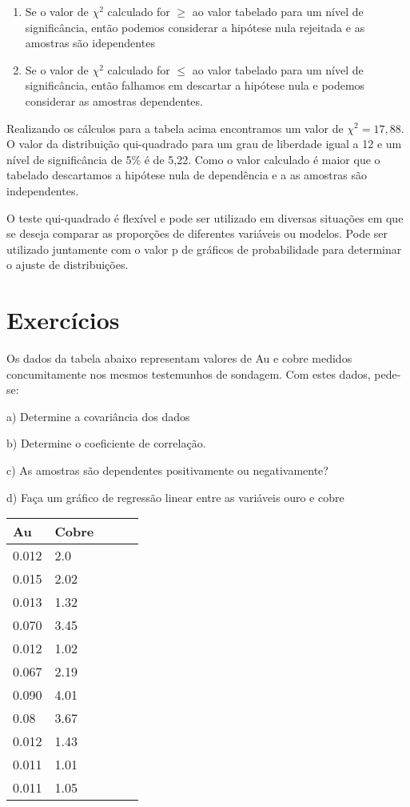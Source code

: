 \begin{enumerate}
	\item Se o valor de $\chi^2$ calculado for $\geq$ ao valor tabelado para um nível de significância, então podemos considerar a hipótese nula rejeitada e as amostras são idependentes
	\item Se o valor de $\chi^2$ calculado for $\leq$ ao valor tabelado para um nível de significância, então falhamos em descartar a hipótese nula e podemos considerar as amostras dependentes. 
\end{enumerate}

Realizando os cálculos para a tabela acima encontramos um valor de $\chi^2= 17,88$. O valor da distribuição qui-quadrado para um grau de liberdade igual a 12 e um nível de significância de 5\% é de 5,22. Como o valor calculado é maior que o tabelado descartamos a hipótese nula de dependência e a as amostras são independentes. 

O teste qui-quadrado é flexível e pode ser utilizado em diversas situações em que se deseja comparar as proporções de diferentes variáveis ou modelos. Pode ser utilizado juntamente com o valor p de gráficos de probabilidade para determinar o ajuste de distribuições. 

\section{Exercícios}

\begin{exercise}
	
	Os dados da tabela abaixo representam valores de Au e cobre medidos concumitamente nos mesmos testemunhos de sondagem. Com estes dados, pede-se:
	
	a) Determine a covariância dos dados 
	
	b) Determine o coeficiente de correlação.
	
	c) As amostras são dependentes positivamente ou negativamente?
	
	d) Faça um gráfico de regressão linear entre as variáveis ouro e cobre
	
	\begin{tabular}{lllll}
		\hline
		Au & Cobre &  &  &  \\ \hline
		0.012      & 2.0  &  &  &  \\
		0.015      & 2.02 &  &  &  \\
		0.013      & 1.32 &  &  &  \\
		0.070      & 3.45 &  &  &  \\
		0.012      & 1.02 &  &  &  \\
		0.067      & 2.19 &  &  &  \\
		0.090      & 4.01 &  &  &  \\
		0.08      & 3.67 &  &  &  \\
		0.012      & 1.43 &  &  &  \\
		0.011      & 1.01 &  &  &  \\
		0.011      & 1.05 &  &  &  \\ \hline
	\end{tabular}
\end{exercise}

